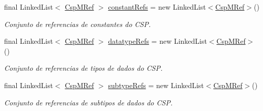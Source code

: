 \begin{DoxyCompactItemize}
final Linked\+List$<$ \hyperlink{classcom_1_1fware_1_1cspdt_1_1cspm_1_1core_1_1model_1_1_csp_m_ref}{Csp\+M\+Ref} $>$ \hyperlink{classcom_1_1fware_1_1cspdt_1_1cspm_1_1core_1_1model_1_1_csp_m_model_acc4e8a009ea0daa5ccbd3752d3e6b89f}{constant\+Refs} = new Linked\+List$<$\hyperlink{classcom_1_1fware_1_1cspdt_1_1cspm_1_1core_1_1model_1_1_csp_m_ref}{Csp\+M\+Ref}$>$()
\begin{DoxyCompactList}\small\item\em Conjunto de referencias de constantes do C\+SP. \end{DoxyCompactList}\item 
\mbox{\label{classcom_1_1fware_1_1cspdt_1_1cspm_1_1core_1_1model_1_1_csp_m_model_aef5c4cf5b8e4548181e5f8ba831086d2}} 
final Linked\+List$<$ \hyperlink{classcom_1_1fware_1_1cspdt_1_1cspm_1_1core_1_1model_1_1_csp_m_ref}{Csp\+M\+Ref} $>$ \hyperlink{classcom_1_1fware_1_1cspdt_1_1cspm_1_1core_1_1model_1_1_csp_m_model_aef5c4cf5b8e4548181e5f8ba831086d2}{datatype\+Refs} = new Linked\+List$<$\hyperlink{classcom_1_1fware_1_1cspdt_1_1cspm_1_1core_1_1model_1_1_csp_m_ref}{Csp\+M\+Ref}$>$()
\begin{DoxyCompactList}\small\item\em Conjunto de referencias de tipos de dados do C\+SP. \end{DoxyCompactList}\item 
\mbox{\label{classcom_1_1fware_1_1cspdt_1_1cspm_1_1core_1_1model_1_1_csp_m_model_aa5ad45b134156a73c9a46408a74f7846}} 
final Linked\+List$<$ \hyperlink{classcom_1_1fware_1_1cspdt_1_1cspm_1_1core_1_1model_1_1_csp_m_ref}{Csp\+M\+Ref} $>$ \hyperlink{classcom_1_1fware_1_1cspdt_1_1cspm_1_1core_1_1model_1_1_csp_m_model_aa5ad45b134156a73c9a46408a74f7846}{subtype\+Refs} = new Linked\+List$<$\hyperlink{classcom_1_1fware_1_1cspdt_1_1cspm_1_1core_1_1model_1_1_csp_m_ref}{Csp\+M\+Ref}$>$()
\begin{DoxyCompactList}\small\item\em Conjunto de referencias de subtipos de dados do C\+SP. \end{DoxyCompactList}\item 
\mbox{\label{classcom_1_1fware_1_1cspdt_1_1cspm_1_1core_1_1model_1_1_csp_m_model_a56e20f5eedda41f95187c8b81506b7a5}} 

\end{DoxyCompactItemize}
